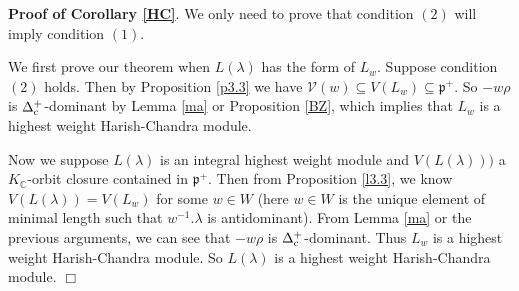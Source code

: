 \documentclass{amsart}[12pt]
\renewcommand{\subset}{\subseteq}
\numberwithin{equation}{section}
\begin{document}
{\bf Proof of Corollary \ref{HC}}. We only need to prove that condition $(2)$ will imply condition $(1)$.

We first prove our theorem when $L(\lambda)$ has the form of $L_w$.
Suppose condition $(2)$ holds. Then by Proposition \ref{p3.3} we have $\mathcal{V}(w)\subset V(L_w)\subset \mathfrak{p}^+$. 
So  $-w\rho$ is $\Delta_{\rm{c}}^+$-dominant by Lemma \ref{ma} or Proposition \ref{BZ}, which implies that 
$L_w$ is a highest weight Harish-Chandra module.

Now we suppose $L(\lambda)$ is an integral highest weight module and $V(L(\lambda)))$ a $K_{\mathbb{C}}$-orbit closure contained in $\mathfrak{p}^+$.
Then from Proposition \ref{l3.3}, we know $V(L(\lambda))=V(L_w)$ for some $w\in W$ (here $ w\in W $ is the unique element of minimal length such that $ w^{-1}.\lambda $ is antidominant).   From Lemma \ref{ma} or the previous arguments, we can see that $-w\rho$ is $\Delta_{\rm{c}}^+$-dominant.  Thus $L_w$ is a highest weight Harish-Chandra module.
So $L(\lambda)$ is a highest weight Harish-Chandra module. \quad \quad\quad\quad\quad\quad\quad\quad\quad\quad\quad\quad\quad\quad\quad\quad\quad\quad\quad\quad\quad\quad\quad\quad\quad\quad\quad\quad $\Box$
\end{document}
